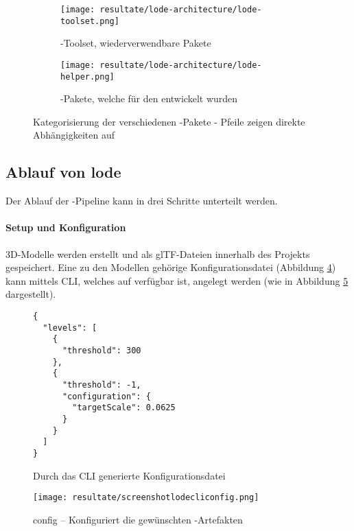 \begin{figure}[H]
  \begin{subfigure}{.5\textwidth}
    \centering
    \texttt{[image: resultate/lode-architecture/lode-toolset.png]}
    \caption{-Toolset, wiederverwendbare Pakete}
    \label{fig:lodeToolset}
  \end{subfigure}%
  \begin{subfigure}{.5\textwidth}
    \centering
    \texttt{[image: resultate/lode-architecture/lode-helper.png]}
    \caption{-Pakete, welche für den  entwickelt wurden}
    \label{fig:lodeHelper}
  \end{subfigure}
  \caption{Kategorisierung der verschiedenen -Pakete - Pfeile zeigen direkte Abhängigkeiten auf}
  \label{fig:lodePackages}
\end{figure}

\subsection{Ablauf von lode}

Der Ablauf der -Pipeline kann in drei Schritte unterteilt werden.

\paragraph{Setup und Konfiguration}
3D-Modelle werden erstellt und als glTF-Dateien innerhalb des Projekts gespeichert. Eine zu den Modellen gehörige Konfigurationsdatei (Abbildung \ref{fig:lodeConfigFile}) kann mittels \gls{CLI}, welches auf  verfügbar ist, angelegt werden (wie in Abbildung \ref{fig:lodecliconfig} dargestellt).

\begin{figure}[H]
  \begin{lstlisting}[style=json]
{
  "levels": [
    {
      "threshold": 300
    },
    {
      "threshold": -1,
      "configuration": {
        "targetScale": 0.0625
      }
    }
  ]
}
  \end{lstlisting}
\caption{Durch das CLI generierte Konfigurationsdatei}
\label{fig:lodeConfigFile}
\end{figure}

\begin{figure}[H]
  \centering
  \texttt{[image: resultate/screenshotlodecliconfig.png]}
  \caption{ config – Konfiguriert die gewünschten -Artefakten}
  \label{fig:lodecliconfig}
\end{figure}

